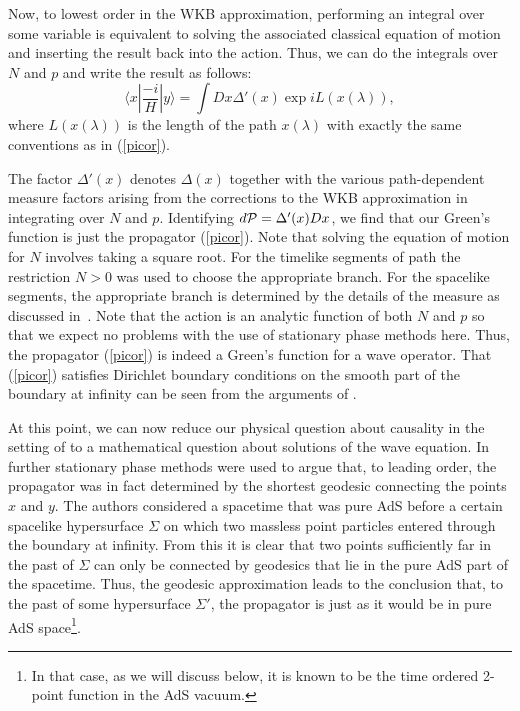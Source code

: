 \documentclass[a4paper,12pt]{article}
\begin{document}
Now, to lowest order in the WKB approximation, performing an integral
over some variable is equivalent to solving the associated classical
equation of motion and inserting the result back into the action.
Thus, we can do the integrals over $N$ and $p$ and write the result as
follows:
\begin{equation}
\label{skel4}
\langle x| \frac{-i}{H}| y \rangle = 
\int Dx \Delta'(x) \exp{i L(x(\lambda))},
\end{equation}
where $L(x(\lambda))$ is the length of the path $x(\lambda)$
with exactly the same conventions as in (\ref{picor}).

The factor $\Delta'(x)$ denotes $\Delta(x)$ together with the various
path-dependent measure factors arising from the corrections to the WKB
approximation in integrating over $N$ and $p$.  Identifying $d{\cal P} =
\Delta'(x) Dx$, we find that our Green's function is just the
propagator (\ref{picor}).  Note that solving the equation of motion
for $N$ involves taking a square root.  For the timelike segments of
path the restriction $N >0$ was used to choose the appropriate branch.
For the spacelike segments, the appropriate branch is determined by
the details of the measure as discussed in~\cite{piINST}.  Note that
the action is an analytic function of both $N$ and $p$ so that we
expect no problems with the use of stationary phase methods here.
Thus, the propagator (\ref{picor}) is indeed a Green's function for a
wave operator.  That (\ref{picor}) satisfies Dirichlet boundary
conditions on the smooth part of the boundary at infinity can be seen
from the arguments of \cite{Fuller}.

At this point, we can now reduce our physical question about causality
in the setting of \cite{holopart} to a mathematical question about
solutions of the wave equation.  In \cite{holopart} further stationary
phase methods were used to argue that, to leading order, the
propagator was in fact determined by the shortest geodesic connecting
the points $x$ and $y$.  The authors considered a spacetime that was pure
AdS before a certain spacelike hypersurface $\Sigma$ on which two
massless point particles entered through the boundary at infinity.
{}From this it is clear that two points sufficiently far in the past
of $\Sigma$ can only be connected by geodesics that lie in the pure
AdS part of the spacetime.  Thus, the geodesic approximation leads to
the conclusion that, to the past of some hypersurface $\Sigma'$, the
propagator is just as it would be in pure AdS space\footnote{In that
  case, as we will discuss below, it is known to be the time ordered
  2-point function in the AdS vacuum.}.
\end{document}
